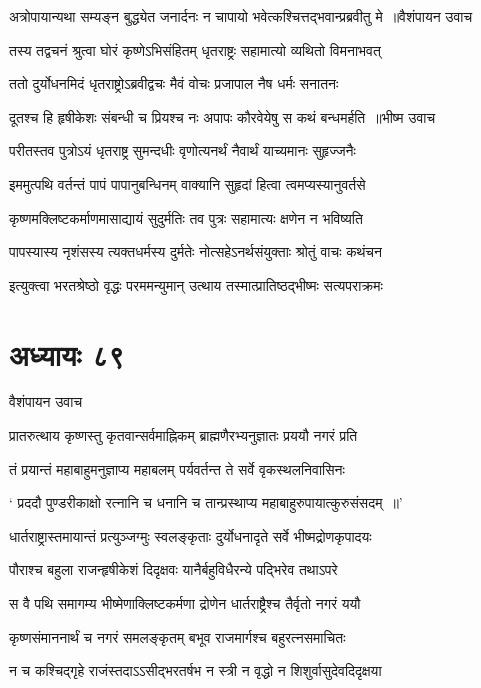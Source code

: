 \threelineshloka
{अत्रोपायान्यथा सम्यङ्न बुद्ध्येत जनार्दनः}
{न चापायो भवेत्कश्चित्तद्भवान्प्रब्रवीतु मे ॥वैशंपायन उवाच}
{}


\twolineshloka
{तस्य तद्वचनं श्रुत्वा घोरं कृष्णेऽभिसंहितम्}
{धृतराष्ट्रः सहामात्यो व्यथितो विमनाभवत्}


\twolineshloka
{ततो दुर्योधनमिदं धृतराष्ट्रोऽब्रवीद्वचः}
{मैवं वोचः प्रजापाल नैष धर्मः सनातनः}


\threelineshloka
{दूतश्च हि हृषीकेशः संबन्धी च प्रियश्च नः}
{अपापः कौरवेयेषु स कथं बन्धमर्हति ॥भीष्म उवाच}
{}


\twolineshloka
{परीतस्तव पुत्रोऽयं धृतराष्ट्र सुमन्दधीः}
{वृणोत्यनर्थं नैवार्थं याच्यमानः सुहृज्जनैः}


\twolineshloka
{इममुत्पथि वर्तन्तं पापं पापानुबन्धिनम्}
{वाक्यानि सुहृदां हित्वा त्वमप्यस्यानुवर्तसे}


\twolineshloka
{कृष्णमक्लिष्टकर्माणमासाद्यायं सुदुर्मतिः}
{तव पुत्रः सहामात्यः क्षणेन न भविष्यति}


\twolineshloka
{पापस्यास्य नृशंसस्य त्यक्तधर्मस्य दुर्मतेः}
{नोत्सहेऽनर्थसंयुक्ताः श्रोतुं वाचः कथंचन}


\twolineshloka
{इत्युक्त्वा भरतश्रेष्ठो वृद्धः परममन्युमान्}
{उत्थाय तस्मात्प्रातिष्ठद्भीष्मः सत्यपराक्रमः}


\chapter{अध्यायः ८९}
\twolineshloka
{वैशंपायन उवाच}
{}


\twolineshloka
{प्रातरुत्थाय कृष्णस्तु कृतवान्सर्वमाह्निकम्}
{ब्राह्मणैरभ्यनुज्ञातः प्रययौ नगरं प्रति}


\twolineshloka
{तं प्रयान्तं महाबाहुमनुज्ञाप्य महाबलम्}
{पर्यवर्तन्त ते सर्वे वृकस्थलनिवासिनः}


\twolineshloka
{` प्रददौ पुण्डरीकाक्षो रत्नानि च धनानि च}
{तान्प्रस्थाप्य महाबाहुरुपायात्कुरुसंसदम् ॥'}


\twolineshloka
{धार्तराष्ट्रास्तमायान्तं प्रत्युञ्जग्मुः स्वलङ्कृताः}
{दुर्योधनादृते सर्वे भीष्मद्रोणकृपादयः}


\twolineshloka
{पौराश्च बहुला राजन्हृषीकेशं दिदृक्षवः}
{यानैर्बहुविधैरन्ये पद्भिरेव तथाऽपरे}


\twolineshloka
{स वै पथि समागम्य भीष्मेणाक्लिष्टकर्मणा}
{द्रोणेन धार्तराष्ट्रैश्च तैर्वृतो नगरं ययौ}


\twolineshloka
{कृष्णसंमाननार्थं च नगरं समलङ्कृतम्}
{बभूव राजमार्गश्च बहुरत्नसमाचितः}


\twolineshloka
{न च कश्चिद्गृहे राजंस्तदाऽऽसीद्भरतर्षभ}
{न स्त्री न वृद्धो न शिशुर्वासुदेवदिदृक्षया}



